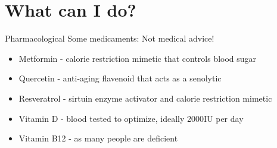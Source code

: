 \section{What can I do?}



\begin{frame}[c]{Pharmacological}
    Some medicaments: Not medical advice!

    \begin{itemize}[<+(1)->]
        \item Metformin - calorie restriction mimetic that controls blood sugar
        \item Quercetin - anti-aging flavenoid that acts as a senolytic
        \item Resveratrol - sirtuin enzyme activator and calorie restriction mimetic
        \item Vitamin D - blood tested to optimize, ideally 2000IU per day
        \item Vitamin B12 - as many people are deficient
    \end{itemize}


\end{frame}
